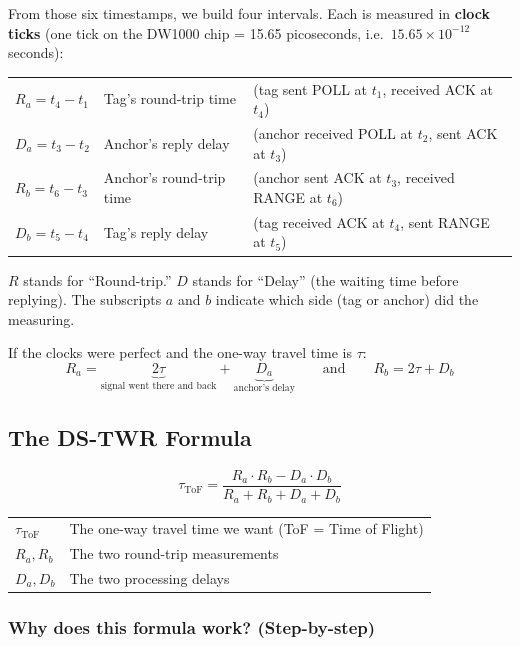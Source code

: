 \documentclass[11pt,a4paper]{article}
\begin{document}
From those six timestamps, we build four intervals. Each is measured in \textbf{clock ticks} (one tick on the DW1000 chip = 15.65 picoseconds, i.e.\ $15.65 \times 10^{-12}$ seconds):

\begin{symbols}
\begin{tabular}{lll}
$R_a = t_4 - t_1$ & Tag's round-trip time & (tag sent POLL at $t_1$, received ACK at $t_4$) \\
$D_a = t_3 - t_2$ & Anchor's reply delay & (anchor received POLL at $t_2$, sent ACK at $t_3$) \\
$R_b = t_6 - t_3$ & Anchor's round-trip time & (anchor sent ACK at $t_3$, received RANGE at $t_6$) \\
$D_b = t_5 - t_4$ & Tag's reply delay & (tag received ACK at $t_4$, sent RANGE at $t_5$) \\
\end{tabular}
\end{symbols}

\bigskip
$R$ stands for ``Round-trip.'' $D$ stands for ``Delay'' (the waiting time before replying). The subscripts $a$ and $b$ indicate which side (tag or anchor) did the measuring.

If the clocks were perfect and the one-way travel time is $\tau$:
\[
R_a = \underbrace{2\tau}_{\text{signal went there and back}} + \underbrace{D_a}_{\text{anchor's delay}}
\qquad\text{and}\qquad
R_b = 2\tau + D_b
\]

\subsection{The DS-TWR Formula}

\begin{equation}
\boxed{
\tau_{\text{ToF}} = \frac{R_a \cdot R_b - D_a \cdot D_b}{R_a + R_b + D_a + D_b}
}
\label{eq:dstwr}
\end{equation}

\begin{symbols}
\begin{tabular}{ll}
$\tau_{\text{ToF}}$ & The one-way travel time we want (ToF = Time of Flight) \\
$R_a, R_b$ & The two round-trip measurements \\
$D_a, D_b$ & The two processing delays \\
\end{tabular}
\end{symbols}

\subsubsection{Why does this formula work? (Step-by-step)}
\end{document}
